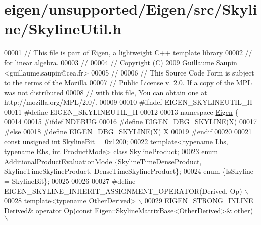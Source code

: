\hypertarget{eigen_2unsupported_2_eigen_2src_2_skyline_2_skyline_util_8h_source}{}\section{eigen/unsupported/\+Eigen/src/\+Skyline/\+Skyline\+Util.h}
\label{eigen_2unsupported_2_eigen_2src_2_skyline_2_skyline_util_8h_source}

\begin{DoxyCode}
00001 \textcolor{comment}{// This file is part of Eigen, a lightweight C++ template library}
00002 \textcolor{comment}{// for linear algebra.}
00003 \textcolor{comment}{//}
00004 \textcolor{comment}{// Copyright (C) 2009 Guillaume Saupin <guillaume.saupin@cea.fr>}
00005 \textcolor{comment}{//}
00006 \textcolor{comment}{// This Source Code Form is subject to the terms of the Mozilla}
00007 \textcolor{comment}{// Public License v. 2.0. If a copy of the MPL was not distributed}
00008 \textcolor{comment}{// with this file, You can obtain one at http://mozilla.org/MPL/2.0/.}
00009 
00010 \textcolor{preprocessor}{#ifndef EIGEN\_SKYLINEUTIL\_H}
00011 \textcolor{preprocessor}{#define EIGEN\_SKYLINEUTIL\_H}
00012 
00013 \textcolor{keyword}{namespace }\hyperlink{namespace_eigen}{Eigen} \{ 
00014 
00015 \textcolor{preprocessor}{#ifdef NDEBUG}
00016 \textcolor{preprocessor}{#define EIGEN\_DBG\_SKYLINE(X)}
00017 \textcolor{preprocessor}{#else}
00018 \textcolor{preprocessor}{#define EIGEN\_DBG\_SKYLINE(X) X}
00019 \textcolor{preprocessor}{#endif}
00020 
00021 \textcolor{keyword}{const} \textcolor{keywordtype}{unsigned} \textcolor{keywordtype}{int} SkylineBit = 0x1200;
\hyperlink{class_eigen_1_1_skyline_product}{00022} \textcolor{keyword}{template}<\textcolor{keyword}{typename} Lhs, \textcolor{keyword}{typename} Rhs, \textcolor{keywordtype}{int} ProductMode> \textcolor{keyword}{class }\hyperlink{class_eigen_1_1_skyline_product}{SkylineProduct};
00023 \textcolor{keyword}{enum} AdditionalProductEvaluationMode \{SkylineTimeDenseProduct, SkylineTimeSkylineProduct, 
      DenseTimeSkylineProduct\};
00024 \textcolor{keyword}{enum} \{IsSkyline = SkylineBit\};
00025 
00026 
00027 \textcolor{preprocessor}{#define EIGEN\_SKYLINE\_INHERIT\_ASSIGNMENT\_OPERATOR(Derived, Op) \(\backslash\)}
00028 \textcolor{preprocessor}{template<typename OtherDerived> \(\backslash\)}
00029 \textcolor{preprocessor}{EIGEN\_STRONG\_INLINE Derived& operator Op(const Eigen::SkylineMatrixBase<OtherDerived>& other) \(\backslash\)}

\end{DoxyCode}
